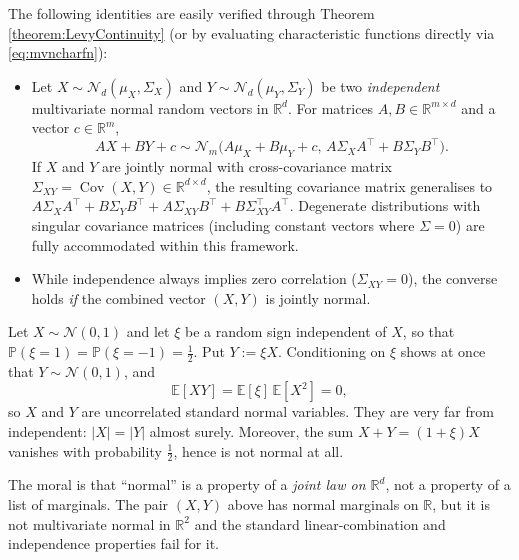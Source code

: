 The following identities are easily verified through Theorem \ref{theorem:LevyContinuity} (or by evaluating characteristic functions directly via \eqref{eq:mvncharfn}):

\begin{itemize}
    \item Let $X \sim \mathcal{N}_d(\mu_X, \Sigma_X)$ and $Y \sim \mathcal{N}_d(\mu_Y, \Sigma_Y)$ be two \emph{independent} multivariate normal random vectors in $\mathbb{R}^d$.  For matrices $A, B \in \mathbb{R}^{m \times d}$ and a vector $c \in \mathbb{R}^m$, 
    \[
    AX + BY + c \sim \mathcal{N}_m\bigl(A\mu_X + B\mu_Y + c,\, A\Sigma_X A^{\top} + B\Sigma_Y B^{\top}\bigr).
    \]
    If $X$ and $Y$ are jointly normal with cross-covariance matrix $\Sigma_{XY} = \operatorname{Cov}(X,Y) \in \mathbb{R}^{d \times d}$, the resulting covariance matrix generalises to $A\Sigma_X A^{\top} + B\Sigma_Y B^{\top} + A\Sigma_{XY}B^{\top} + B\Sigma_{XY}^{\top} A^{\top}$. Degenerate distributions with singular covariance matrices (including constant vectors where $\Sigma = 0$) are fully accommodated within this framework.

  


    \item While independence always implies zero correlation ($\Sigma_{XY} = 0$), the converse holds \emph{if} the combined vector $(X, Y)$ is jointly normal.
\end{itemize}

\begin{remark}\label{rem:gaussiantraps}
Let $X \sim \mathcal{N}(0,1)$ and let $\xi$ be a random sign independent of $X$, so that $\mathbb{P}(\xi = 1) = \mathbb{P}(\xi = -1) = \tfrac{1}{2}$. Put $Y := \xi X$. Conditioning on $\xi$ shows at once that $Y \sim \mathcal{N}(0,1)$, and
\[
\mathbb{E}[XY] = \mathbb{E}[\xi]\,\mathbb{E}[X^2] = 0,
\]
so $X$ and $Y$ are uncorrelated standard normal variables. They are very far from independent: $|X| = |Y|$ almost surely. Moreover, the sum $X + Y = (1+\xi)X$ vanishes with probability $\tfrac{1}{2}$, hence is not normal at all.

The moral is that ``normal'' is a property of a \emph{joint law on $\mathbb{R}^d$}, not a property of a list of marginals. The pair $(X,Y)$ above has normal marginals on $\mathbb{R}$, but it is not multivariate normal in $\mathbb{R}^2$ and the standard linear-combination and independence properties fail for it.
\end{remark}

